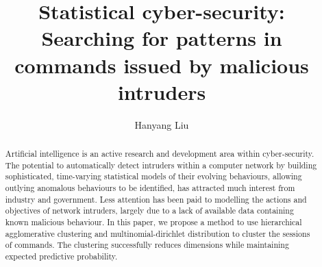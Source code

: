 \documentclass[a4paper, twoside]{report}
\title{Statistical cyber-security: Searching for patterns in commands issued by malicious intruders}
\author{Hanyang Liu}
\begin{document}


\begin{abstract}
    Artificial intelligence is an active research and development area within cyber-security. 
    The potential to automatically detect intruders within a computer network by building sophisticated, 
    time-varying statistical models of their evolving behaviours, 
    allowing outlying anomalous behaviours to be identified, 
    has attracted much interest from industry and government. 
    Less attention has been paid to modelling the actions and objectives of network intruders,
    largely due to a lack of available data containing known malicious behaviour.
    In this paper, we propose a method to use hierarchical agglomerative clustering
    and multinomial-dirichlet distribution to cluster the sessions of commands.
    The clustering successfully reduces dimensions while
    maintaining expected predictive probability.
\end{abstract}


\tableofcontents
\listoffigures
\listoftables










\end{document}
